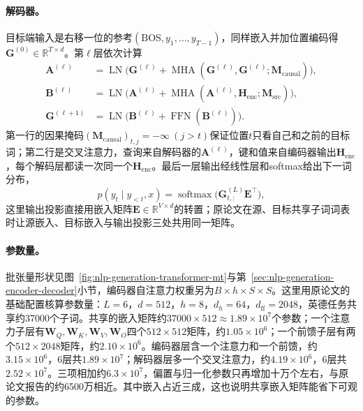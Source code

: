 \paragraph{解码器。}目标端输入是右移一位的参考$(\mathrm{BOS},y_1,\ldots,y_{T-1})$，同样嵌入并加位置编码得$\bm G^{(0)}\in\mathbb R^{T\times d}$。第$\ell$层依次计算
\begin{equation}
  \begin{aligned}
    \bm A^{(\ell)}&=\operatorname{LN}\bigl(\bm G^{(\ell)}+\operatorname{MHA}(\bm G^{(\ell)},\bm G^{(\ell)};\bm M_{\mathrm{causal}})\bigr),\\
    \bm B^{(\ell)}&=\operatorname{LN}\bigl(\bm A^{(\ell)}+\operatorname{MHA}(\bm A^{(\ell)},\bm H_{\mathrm{enc}};\bm M_{\mathrm{src}})\bigr),\\
    \bm G^{(\ell+1)}&=\operatorname{LN}\bigl(\bm B^{(\ell)}+\operatorname{FFN}(\bm B^{(\ell)})\bigr).
  \end{aligned}
  \label{eq:nlp-generation-transformer-decoder}
\end{equation}
第一行的因果掩码$(\bm M_{\mathrm{causal}})_{t,j}=-\infty\ (j>t)$保证位置$t$只看自己和之前的目标词；第二行是交叉注意力，查询来自解码器的$\bm A^{(\ell)}$，键和值来自编码器输出$\bm H_{\mathrm{enc}}$，每个解码层都读一次同一个$\bm H_{\mathrm{enc}}$。最后一层输出经线性层和softmax给出下一词分布，
\begin{equation}
  p(y_t\mid y_{<t},x)=\operatorname{softmax}\bigl(\bm G^{(L)}_{t,:}\bm E^{\top}\bigr),
  \label{eq:nlp-generation-transformer-output}
\end{equation}
这里输出投影直接用嵌入矩阵$\bm E\in\mathbb R^{V\times d}$的转置；原论文在源、目标共享子词词表时让源嵌入、目标嵌入与输出投影三处共用同一矩阵。

\paragraph{参数量。}批张量形状见图~\ref{fig:nlp-generation-transformer-mt}与第~\ref{sec:nlp-generation-encoder-decoder}小节，编码器自注意力权重另为$B\times h\times S\times S$。这里用原论文的基础配置核算参数量：$L=6$，$d=512$，$h=8$，$d_h=64$，$d_{\mathrm{ff}}=2048$，英德任务共享约37000个子词。共享的嵌入矩阵约$37000\times512\approx1.89\times10^7$个参数；一个注意力子层有$\bm W_Q,\bm W_K,\bm W_V,\bm W_O$四个$512\times512$矩阵，约$1.05\times10^6$；一个前馈子层有两个$512\times2048$矩阵，约$2.10\times10^6$。编码器层含一个注意力和一个前馈，约$3.15\times10^6$，6层共$1.89\times10^7$；解码器层多一个交叉注意力，约$4.19\times10^6$，6层共$2.52\times10^7$。三项相加约$6.3\times10^7$，偏置与归一化参数只再增加十万个左右，与原论文报告的约6500万相近。其中嵌入占近三成，这也说明共享嵌入矩阵能省下可观的参数。

